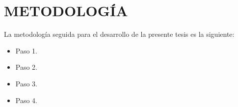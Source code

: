 \section{METODOLOGÍA}

La metodología seguida para el desarrollo de la presente tesis es la siguiente:

\begin{itemize}
\item Paso 1.

\item Paso 2.

\item Paso 3.

\item Paso 4.


\end{itemize}





